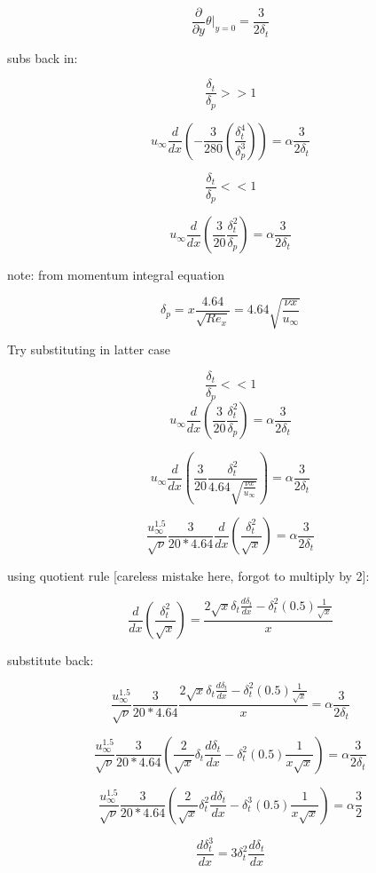 \documentclass[11pt]{article}
\begin{document}
$$\frac{\partial }{\partial y}\theta |_{y=0} = \frac{3}{2\delta_t}$$

subs back in:

$$\frac{\delta_t}{\delta_p} >> 1$$

$$ u_\infty \frac{d}{dx} \left(   - \frac{3}{280} (\frac{ \delta_t^4}{\delta_p^3}) \right)  = \alpha \frac{3}{2\delta_t} $$ 

$$\frac{\delta_t}{\delta_p} << 1$$

$$ u_\infty \frac{d}{dx} \left(  \frac{3}{20} \frac{\delta_t^2}{\delta_p}   \right)  = \alpha \frac{3}{2\delta_t}$$ 

note: from momentum integral equation

$$\delta_p = x \frac{4.64}{\sqrt{Re_x}} = 4.64\sqrt{\frac{\nu x}{u_\infty}}$$

Try substituting in latter case 

$$\frac{\delta_t}{\delta_p} << 1$$
$$ u_\infty \frac{d}{dx} \left(  \frac{3}{20} \frac{\delta_t^2}{\delta_p}   \right)  = \alpha \frac{3}{2\delta_t}$$ 

$$ u_\infty \frac{d}{dx} \left(  \frac{3}{20} \frac{\delta_t^2}{ 4.64\sqrt{\frac{\nu x}{u_\infty}}}   \right)  = \alpha \frac{3}{2\delta_t}$$ 


$$  \frac{u_\infty^{1.5}}{\sqrt{\nu}} \frac{3}{20*4.64} \frac{d}{dx} \left(   \frac{\delta_t^2}{\sqrt{x}}   \right)  = \alpha \frac{3}{2\delta_t}$$ 

using quotient rule [careless mistake here, forgot to multiply by 2]:

$$\frac{d}{dx} \left(   \frac{\delta_t^2}{\sqrt{x}}   \right) = \frac{2\sqrt{x} \delta_t \frac{d \delta_t}{d x} - \delta_t^2 (0.5) \frac{1}{\sqrt{x}}}{x}$$

substitute back:

$$  \frac{u_\infty^{1.5}}{\sqrt{\nu}} \frac{3}{20*4.64} \frac{2 \sqrt{x} \delta_t \frac{d \delta_t}{d x} - \delta_t^2 (0.5) \frac{1}{\sqrt{x}}}{x}  = \alpha \frac{3}{2\delta_t}$$ 

$$  \frac{u_\infty^{1.5}}{\sqrt{\nu}} \frac{3}{20*4.64} (\frac{2}{ \sqrt{x}} \delta_t \frac{d \delta_t}{d x} - \delta_t^2 (0.5) \frac{1}{x\sqrt{x}})  = \alpha \frac{3}{2\delta_t}$$ 

$$  \frac{u_\infty^{1.5}}{\sqrt{\nu}} \frac{3}{20*4.64} (\frac{2}{\sqrt{x}} \delta_t^2 \frac{d \delta_t}{d x} - \delta_t^3 (0.5) \frac{1}{x\sqrt{x}})  = \alpha \frac{3}{2}$$ 


$$\frac{d \delta_t^3}{dx} = 3 \delta_t^2 \frac{d \delta_t}{dx}$$
\end{document}
